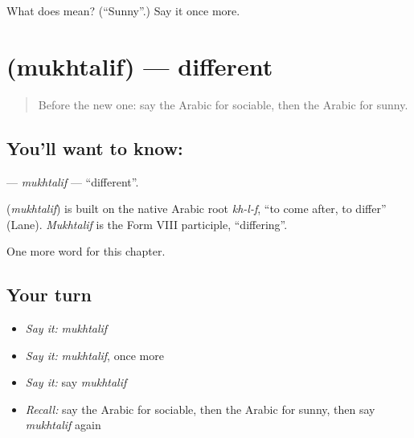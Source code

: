 \begin{tcolorbox}[breakable,colback=teal!4,colframe=teal!35!black,title={Before you move on}]
What does  mean? (\textquotedblleft{}Sunny\textquotedblright{}.) Say it once more.
\end{tcolorbox}
\section[\texorpdfstring{\ar{مختلف} (mukhtalif)}{مختلف (mukhtalif)}]{ (mukhtalif) — different}

\label{lesson:AR-C211-mukhtalif}



\begin{quote}
Before the new one: say the Arabic for sociable, then the Arabic for sunny.
\end{quote}

\subsection*{You'll want to know: }
\textbf{} — \emph{mukhtalif} — \textquotedblleft{}different\textquotedblright{}.

\begin{cousinweb}
\textbf{} (\emph{mukhtalif}) is built on the native Arabic root \emph{kh-l-f}, \textquotedblleft{}to come after, to differ\textquotedblright{} (Lane). \emph{Mukhtalif} is the Form VIII participle, \textquotedblleft{}differing\textquotedblright{}.
\end{cousinweb}

\begin{grammarlens}[title={What you've built}]
One more word for this chapter.
\end{grammarlens}

\subsection*{Your turn}
\begin{itemize}
\raggedright
  \item \emph{Say it:} \emph{mukhtalif}
  \item \emph{Say it:} \emph{mukhtalif}, once more
  \item \emph{Say it:} say \emph{mukhtalif}
  \item \emph{Recall:} say the Arabic for sociable, then the Arabic for sunny, then say \emph{mukhtalif} again
\end{itemize}

